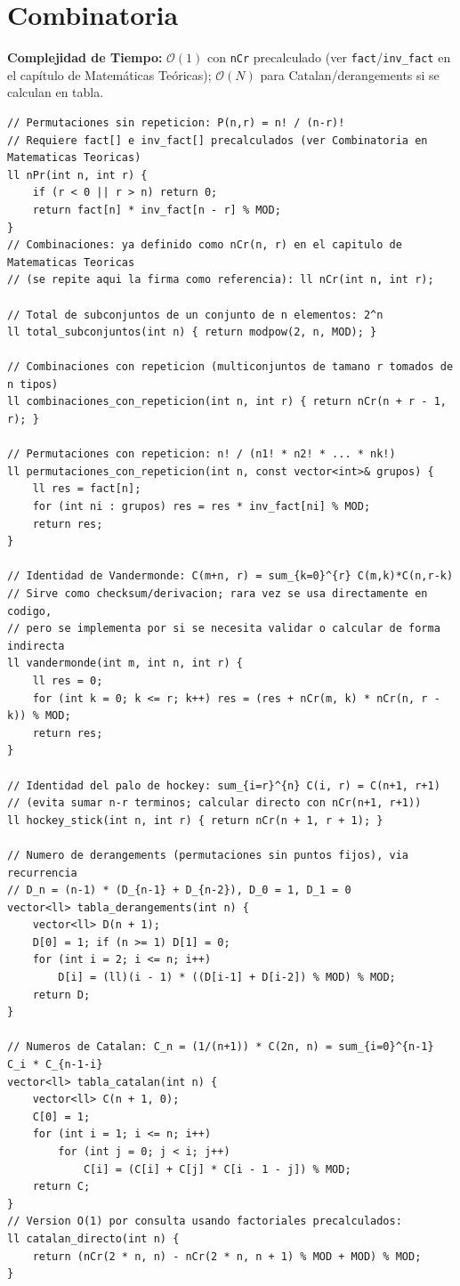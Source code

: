 \documentclass[10pt,twocolumn,letterpaper]{report}
\begin{document}
\section{Combinatoria}
\textbf{Complejidad de Tiempo:} $\mathcal{O}(1)$ con \texttt{nCr} precalculado (ver \texttt{fact}/\texttt{inv\_fact} en el capítulo de Matemáticas Teóricas); $\mathcal{O}(N)$ para Catalan/derangements si se calculan en tabla.
\begin{lstlisting}
// Permutaciones sin repeticion: P(n,r) = n! / (n-r)!
// Requiere fact[] e inv_fact[] precalculados (ver Combinatoria en Matematicas Teoricas)
ll nPr(int n, int r) {
    if (r < 0 || r > n) return 0;
    return fact[n] * inv_fact[n - r] % MOD;
}
// Combinaciones: ya definido como nCr(n, r) en el capitulo de Matematicas Teoricas
// (se repite aqui la firma como referencia): ll nCr(int n, int r);

// Total de subconjuntos de un conjunto de n elementos: 2^n
ll total_subconjuntos(int n) { return modpow(2, n, MOD); }

// Combinaciones con repeticion (multiconjuntos de tamano r tomados de n tipos)
ll combinaciones_con_repeticion(int n, int r) { return nCr(n + r - 1, r); }

// Permutaciones con repeticion: n! / (n1! * n2! * ... * nk!)
ll permutaciones_con_repeticion(int n, const vector<int>& grupos) {
    ll res = fact[n];
    for (int ni : grupos) res = res * inv_fact[ni] % MOD;
    return res;
}

// Identidad de Vandermonde: C(m+n, r) = sum_{k=0}^{r} C(m,k)*C(n,r-k)
// Sirve como checksum/derivacion; rara vez se usa directamente en codigo,
// pero se implementa por si se necesita validar o calcular de forma indirecta
ll vandermonde(int m, int n, int r) {
    ll res = 0;
    for (int k = 0; k <= r; k++) res = (res + nCr(m, k) * nCr(n, r - k)) % MOD;
    return res;
}

// Identidad del palo de hockey: sum_{i=r}^{n} C(i, r) = C(n+1, r+1)
// (evita sumar n-r terminos; calcular directo con nCr(n+1, r+1))
ll hockey_stick(int n, int r) { return nCr(n + 1, r + 1); }

// Numero de derangements (permutaciones sin puntos fijos), via recurrencia
// D_n = (n-1) * (D_{n-1} + D_{n-2}), D_0 = 1, D_1 = 0
vector<ll> tabla_derangements(int n) {
    vector<ll> D(n + 1);
    D[0] = 1; if (n >= 1) D[1] = 0;
    for (int i = 2; i <= n; i++)
        D[i] = (ll)(i - 1) * ((D[i-1] + D[i-2]) % MOD) % MOD;
    return D;
}

// Numeros de Catalan: C_n = (1/(n+1)) * C(2n, n) = sum_{i=0}^{n-1} C_i * C_{n-1-i}
vector<ll> tabla_catalan(int n) {
    vector<ll> C(n + 1, 0);
    C[0] = 1;
    for (int i = 1; i <= n; i++)
        for (int j = 0; j < i; j++)
            C[i] = (C[i] + C[j] * C[i - 1 - j]) % MOD;
    return C;
}
// Version O(1) por consulta usando factoriales precalculados:
ll catalan_directo(int n) {
    return (nCr(2 * n, n) - nCr(2 * n, n + 1) % MOD + MOD) % MOD;
}
\end{lstlisting}
\end{document}
